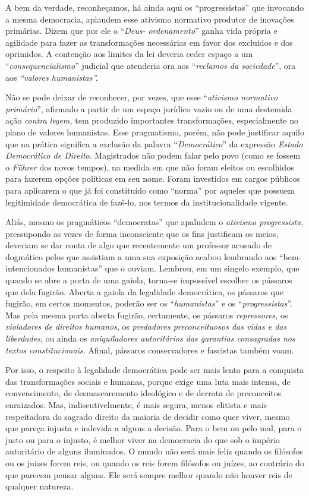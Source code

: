 A bem da verdade, reconheçamos, há ainda aqui os ``progressistas'' que
invocando a mesma democracia, aplaudem esse ativismo normativo produtor
de inovações primárias. Dizem que por ele o ``\emph{Deus- ordenamento}''
ganha vida própria e agilidade para fazer as transformações necessárias
em favor dos excluidos e dos oprimidos. A contenção aos limites da lei
deveria ceder espaço a um ``\emph{consequencialismo}'' judicial que
atenderia ora aos ``\emph{reclamos da sociedade}'', ora aos
\emph{``valores humanistas''.}

Não se pode deixar de reconhecer, por vezes, que esse ``\emph{ativismo
normativo primário}'', afirmado a partir de um espaço jurídico vazio ou
de uma destemida ação \emph{contra legem,} tem produzido importantes
transformações, especialmente no plano de valores humanistas. Esse
pragmatismo, porém, não pode justificar aquilo que na prática significa
a exclusão da palavra ``\emph{Democrático}'' da expressão \emph{Estado
Democrático de Direito}. Magistrados não podem falar pelo povo (como se
fossem o \emph{Führer} dos novos tempos), na medida em que não foram
eleitos ou escolhidos para fazerem opções políticas em seu nome. Foram
investidos em cargos públicos para aplicarem o que já foi constituído
como ``norma'' por aqueles que possuem legitimidade democrática de
fazê-lo, nos termos da institucionalidade vigente.

Aliás, mesmo os pragmáticos ``democratas'' que apaludem o \emph{ativismo
progressista,} pressupondo as vezes de forma inconsciente que os fins
justificam os meios, deveriam se dar conta de algo que recentemente um
professor acusado de dogmático pelos que assistiam a uma sua exposição
acabou lembrando aos ``bem-intencionados humanistas'' que o ouviam.
Lembrou, em um singelo exemplo, que quando se abre a porta de uma
gaiola, torna-se impossível escolher os pássaros que dela fugirão.
Aberta a gaiola da legalidade democrática, os pássaros que fugirão, em
certos momentos, poderão ser os ``\emph{humanistas}'' e os
``\emph{progressistas}''. Mas pela mesma porta aberta fugirão,
certamente, os pássaros \emph{repressores}, os \emph{violadores de
direitos humanos}, os \emph{predadores preconceituosos das vidas e das
liberdades}, ou ainda os \emph{aniquiladores autoritários das garantias
consagradas nos textos constitucionais}. Afinal, pássaros conservadores
e fascistas também voam.

Por isso, o respeito à legalidade democrática pode ser mais lento para a
conquista das transformações sociais e humanas, porque exige uma luta
mais intensa, de convencimento, de desmascaremento ideológico e de
derrota de preconceitos enraizados. Mas, indiscutivelmente, é mais
segura, menos elitista e mais respeitadora do sagrado direito da maioria
de decidir como quer viver, mesmo que pareça injusta e indevida a alguns
a decisão. Para o bem ou pelo mal, para o justo ou para o injusto, é
melhor viver na democracia do que sob o império autoritário de alguns
iluminados. O mundo não será mais feliz quando os filósofos ou os juizes
forem reis, ou quando os reis forem filósofos ou juízes, ao contrário do
que parecem pensar alguns. Ele será sempre melhor quando não houver reis
de qualquer natureza.

